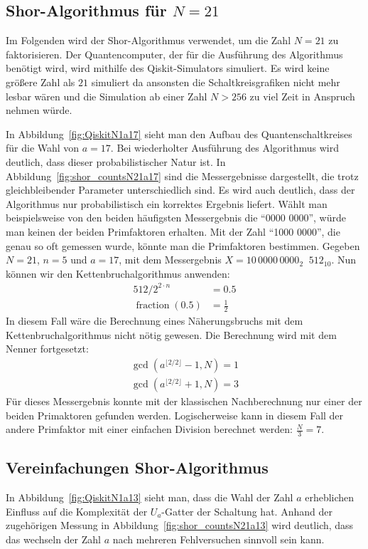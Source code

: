 \documentclass[a4paper,journal]{IEEEtran}
\DeclareMathOperator{\fraction}{fraction}
\DeclareMathOperator{\eqq}{\widehat{=}}
\begin{document}
\subsection{Shor-Algorithmus für \(N = 21\)}
Im Folgenden wird der Shor-Algorithmus verwendet,
um die Zahl \(N = 21\) zu faktorisieren.
Der Quantencomputer, der für die Ausführung des Algorithmus benötigt wird,
wird mithilfe des Qiskit-Simulators simuliert.
Es wird keine größere Zahl als \(21\) simuliert
da ansonsten die Schaltkreisgrafiken nicht mehr lesbar wären und
die Simulation ab einer Zahl \(N > 256\) zu viel Zeit in Anspruch nehmen würde.

In Abbildung~\ref{fig:QiskitN1a17} sieht man den Aufbau des Quantenschaltkreises
für die Wahl von \(a = 17\).
Bei wiederholter Ausführung des Algorithmus wird deutlich,
dass dieser probabilistischer Natur ist.
In Abbildung~\ref{fig:shor_countsN21a17} sind die Messergebnisse dargestellt,
die trotz gleichbleibender Parameter unterschiedlich sind.
Es wird auch deutlich, dass der Algorithmus nur probabilistisch ein korrektes Ergebnis liefert.
Wählt man beispielsweise von den beiden häufigsten Messergebnis die "`0000 0000"',
würde man keinen der beiden Primfaktoren erhalten.
Mit der Zahl "`1000 0000"', die  genau so oft gemessen wurde, könnte man die Primfaktoren bestimmen.
Gegeben \(N = 21\), \(n = 5\) und \(a = 17 \),
mit dem Messergebnis \(X=10\,0000\,0000_2 \eqq 512_{10}\).
Nun können wir den Kettenbruchalgorithmus anwenden:
\begin{align*}
  512/2^{2\cdot n} &= 0.5\\
  \fraction(0.5)   &= \frac{1}{2}
\end{align*}
In diesem Fall wäre die Berechnung eines Näherungsbruchs mit dem Kettenbruchalgorithmus nicht nötig gewesen.
Die Berechnung wird mit dem Nenner fortgesetzt:
\begin{equation*}
\begin{split}
  \gcd(a^{\lfloor 2/2\rfloor}-1, N) = 1\\
  \gcd(a^{\lfloor 2/2\rfloor}+1, N) = 3
\end{split}
\end{equation*}
Für dieses Messergebnis konnte mit der klassischen Nachberechnung
nur einer der beiden Primaktoren gefunden werden.
Logischerweise kann in diesem Fall der andere Primfaktor mit einer einfachen Division berechnet werden:
\(\frac{N}{3} = 7\).

\subsection{Vereinfachungen Shor-Algorithmus}
In Abbildung~\ref{fig:QiskitN1a13} sieht man,
dass die Wahl der Zahl \(a\) erheblichen Einfluss auf die Komplexität der \(U_a\)-Gatter der Schaltung hat.
Anhand der zugehörigen Messung in Abbildung~\ref{fig:shor_countsN21a13} wird deutlich,
dass das wechseln der Zahl \(a\) nach mehreren Fehlversuchen sinnvoll sein kann.
\end{document}
